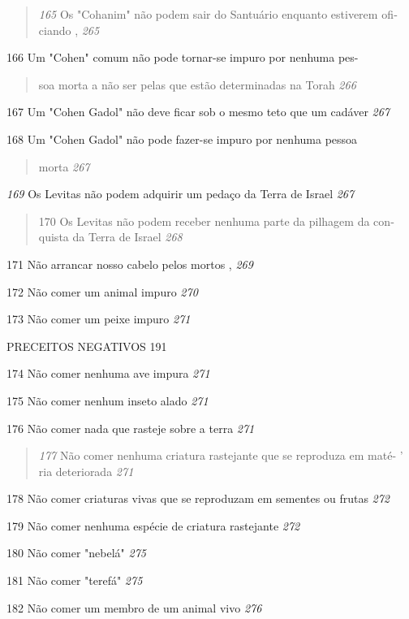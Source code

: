 \begin{quote}
\emph{165} Os "Cohanim" não podem sair do Santuário enquanto estiverem
ofi­ciando , \emph{265}
\end{quote}

166 Um "Cohen" comum não pode tornar-se impuro por nenhuma pes-

\begin{quote}
soa morta a não ser pelas que estão determinadas na Torah \emph{266}
\end{quote}

167 Um "Cohen Gadol" não deve ficar sob o mesmo teto que um cadáver
\emph{267}

168 Um "Cohen Gadol" não pode fazer-se impuro por nenhuma pessoa

\begin{quote}
morta \emph{267}
\end{quote}

\emph{169} Os Levitas não podem adquirir um pedaço da Terra de Israel
\emph{267}

\begin{quote}
170 Os Levitas não podem receber nenhuma parte da pilhagem da con­quista
da Terra de Israel \emph{268}
\end{quote}

171 Não arrancar nosso cabelo pelos mortos , \emph{269}

172 Não comer um animal impuro \emph{270}

173 Não comer um peixe impuro \emph{271}

PRECEITOS NEGATIVOS 191

174 Não comer nenhuma ave impura \emph{271}

175 Não comer nenhum inseto alado \emph{271}

176 Não comer nada que rasteje sobre a terra \emph{271}

\begin{quote}
\emph{177} Não comer nenhuma criatura rastejante que se reproduza em
maté- ' ria deteriorada \emph{271}
\end{quote}

178 Não comer criaturas vivas que se reproduzam em sementes ou frutas
\emph{272}

179 Não comer nenhuma espécie de criatura rastejante \emph{272}

180 Não comer "nebelá" \emph{275}

181 Não comer "terefá" \emph{275}

182 Não comer um membro de um animal vivo \emph{276}

